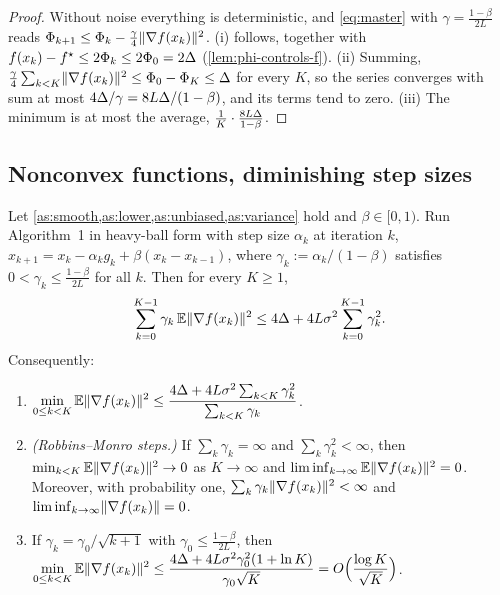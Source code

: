 \begin{proof}
Without noise everything is deterministic, and \eqref{eq:master} with
$\gamma=\frac{1-\beta}{2L}$ reads $\Phi_{k+1}\le\Phi_k-\frac\gamma4\lVert \nabla f(x_k)\rVert^2$.
(i) follows, together with $f(x_k)-f^\star\le2\Phi_k\le2\Phi_0=2\Delta$
(\cref{lem:phi-controls-f}). (ii) Summing, $\frac\gamma4\sum_{k<K}\lVert \nabla f(x_k)\rVert^2\le\Phi_0-\Phi_K\le\Delta$
for every $K$, so the series converges with sum at most $4\Delta/\gamma=8L\Delta/(1-\beta)$, and its
terms tend to zero. (iii) The minimum is at most the average, $\frac1K\cdot\frac{8L\Delta}{1-\beta}$.
\end{proof}

\subsection{Nonconvex functions, diminishing step sizes}

\begin{theorem}\label{thm:diminishing}
Let \cref{as:smooth,as:lower,as:unbiased,as:variance} hold and $\beta\in[0,1)$. Run
Algorithm~1 in heavy-ball form with step size $\alpha_k$ at iteration $k$,
$x_{k+1}=x_k-\alpha_kg_k+\beta(x_k-x_{k-1})$, where $\gamma_k:=\alpha_k/(1-\beta)$ satisfies
$0<\gamma_k\le\frac{1-\beta}{2L}$ for all $k$. Then for every $K\ge1$,
\begin{equation}\label{eq:diminishing}
  \sum_{k=0}^{K-1}\gamma_k\,\mathbb{E}\lVert \nabla f(x_k)\rVert^2\le4\Delta+4L\sigma^2\sum_{k=0}^{K-1}\gamma_k^2 .
\end{equation}
Consequently:
\begin{enumerate}[label=\textup{(\alph*)}]
\item $\displaystyle\min_{0\le k<K}\mathbb{E}\lVert \nabla f(x_k)\rVert^2\le
       \frac{4\Delta+4L\sigma^2\sum_{k<K}\gamma_k^2}{\sum_{k<K}\gamma_k}$.
\item \emph{(Robbins--Monro steps.)} If $\sum_k\gamma_k=\infty$ and $\sum_k\gamma_k^2<\infty$,
  then $\min_{k<K}\mathbb{E}\lVert \nabla f(x_k)\rVert^2\to0$ as $K\to\infty$ and
  $\liminf_{k\to\infty}\mathbb{E}\lVert \nabla f(x_k)\rVert^2=0$. Moreover, with probability one,
  $\sum_k\gamma_k\lVert \nabla f(x_k)\rVert^2<\infty$ and $\liminf_{k\to\infty}\lVert \nabla f(x_k)\rVert=0$.
\item If $\gamma_k=\gamma_0/\sqrt{k+1}$ with $\gamma_0\le\frac{1-\beta}{2L}$, then
  $\displaystyle\min_{0\le k<K}\mathbb{E}\lVert \nabla f(x_k)\rVert^2\le\frac{4\Delta+4L\sigma^2\gamma_0^2(1+\ln K)}{\gamma_0\sqrt K}
  =O\Bigl(\frac{\log K}{\sqrt K}\Bigr)$.
\end{enumerate}
\end{theorem}

